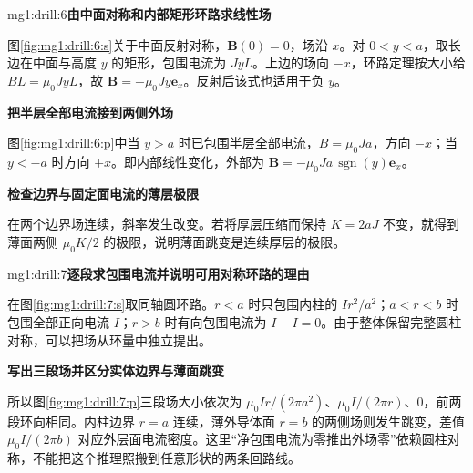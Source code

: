 \begin{drillsolution}{mg1:drill:6}\textbf{由中面对称和内部矩形环路求线性场}\par\nobreak
图\ref{fig:mg1:drill:6:s}关于中面反射对称，$\bm B(0)=0$，场沿 $x$。对 $0<y<a$，取长边在中面与高度 $y$ 的矩形，包围电流为 $JyL$。上边的场向 $-x$，环路定理按大小给 $BL=\mu_0JyL$，故 $\bm B=-\mu_0Jy\bm e_x$。反射后该式也适用于负 $y$。



\par\medskip{}\noindent\textbf{把半层全部电流接到两侧外场}\par\nobreak
图\ref{fig:mg1:drill:6:p}中当 $y>a$ 时已包围半层全部电流，$B=\mu_0Ja$，方向 $-x$；当 $y<-a$ 时方向 $+x$。即内部线性变化，外部为 $\bm B=-\mu_0Ja\,\operatorname{sgn}(y)\bm e_x$。

\par\medskip{}\noindent\textbf{检查边界与固定面电流的薄层极限}\par\nobreak
在两个边界场连续，斜率发生改变。若将厚层压缩而保持 $K=2aJ$ 不变，就得到薄面两侧 $\mu_0K/2$ 的极限，说明薄面跳变是连续厚层的极限。\end{drillsolution}
\begin{drillsolution}{mg1:drill:7}\textbf{逐段求包围电流并说明可用对称环路的理由}\par\nobreak
在图\ref{fig:mg1:drill:7:s}取同轴圆环路。$r<a$ 时只包围内柱的 $Ir^2/a^2$；$a<r<b$ 时包围全部正向电流 $I$；$r>b$ 时有向包围电流为 $I-I=0$。由于整体保留完整圆柱对称，可以把场从环量中独立提出。



\par\medskip{}\noindent\textbf{写出三段场并区分实体边界与薄面跳变}\par\nobreak
所以图\ref{fig:mg1:drill:7:p}三段场大小依次为 $\mu_0Ir/(2\pi a^2)$、$\mu_0I/(2\pi r)$、0，前两段环向相同。内柱边界 $r=a$ 连续，薄外导体面 $r=b$ 的两侧场则发生跳变，差值 $\mu_0I/(2\pi b)$ 对应外层面电流密度。这里“净包围电流为零推出外场零”依赖圆柱对称，不能把这个推理照搬到任意形状的两条回路线。\end{drillsolution}
